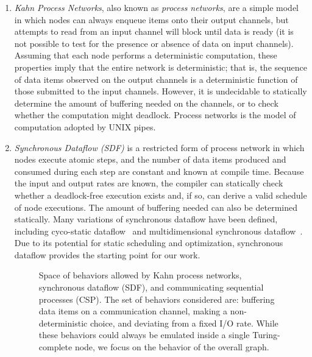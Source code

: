 \begin{enumerate}

\item {\it Kahn Process Networks}, also known as {\it process
  networks}, are a simple model in which nodes can always enqueue
  items onto their output channels, but attempts to read from an input
  channel will block until data is ready (it is not possible to test
  for the presence or absence of data on input channels).  Assuming
  that each node performs a deterministic computation, these
  properties imply that the entire network is deterministic; that is,
  the sequence of data items observed on the output channels is a
  deterministic function of those submitted to the input channels.
  However, it is undecidable to statically determine the amount of
  buffering needed on the channels, or to check whether the
  computation might deadlock.  Process networks is the model of
  computation adopted by UNIX pipes.

\item {\it Synchronous Dataflow (SDF)} is a restricted form of process
  network in which nodes execute atomic steps, and the number of data
  items produced and consumed during each step are constant and known
  at compile time.  Because the input and output rates are known, the
  compiler can statically check whether a deadlock-free execution
  exists and, if so, can derive a valid schedule of node executions.
  The amount of buffering needed can also be determined statically.
  Many variations of synchronous dataflow have been defined, including
  cyco-static
  dataflow~\cite{bilsen_cyclo-static_1995,parks_comparison_1995} and
  multidimensional synchronous
  dataflow~\cite{murthy_multidimensional_2002}.  Due to its potential
  for static scheduling and optimization, synchronous dataflow
  provides the starting point for our work.

\begin{figure}[t]
\centering{}
\caption[Space of behaviors allowable by different models of
  computation]{Space of behaviors allowed by Kahn process networks,
  synchronous dataflow (SDF), and communicating sequential processes
  (CSP).  The set of behaviors considered are: buffering data items on
  a communication channel, making a non-deterministic choice, and
  deviating from a fixed I/O rate.  While these behaviors could always
  be emulated inside a single Turing-complete node, we focus on the
  behavior of the overall graph.
  \protect\label{fig:models-of-computation}}
\end{figure}


\end{enumerate}
